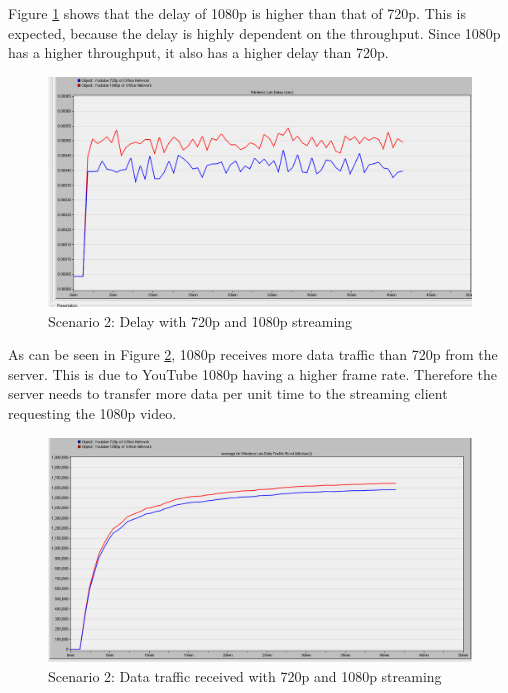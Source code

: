 Figure \ref{fig:2:delay:720p180p} shows that the delay of 1080p is higher than that of 720p. This is expected, because the delay is highly dependent on the throughput. Since 1080p has a higher throughput, it also has a higher delay than 720p.

\begin{figure}[H]
	\centering
	\includegraphics[scale=0.31]{Figures/amantianrenamed/Scenario2Delayof720pand1080p.png}
	\caption{Scenario 2: Delay with 720p and 1080p streaming}
	\label{fig:2:delay:720p180p}
\end{figure}

As can be seen in Figure \ref{fig:2:traffic:720p180p}, 1080p receives more data traffic than 720p from the server. This is due to YouTube 1080p having a higher frame rate. Therefore the server needs to transfer more data per unit time to the streaming client requesting the 1080p video.

\begin{figure}[H]
	\centering
	\includegraphics[scale=0.35]{Figures/amantianrenamed/Scenario2Averagedatatrafficreceivedof720pand1080p.png}
	\caption{Scenario 2: Data traffic received with 720p and 1080p streaming}
	\label{fig:2:traffic:720p180p}
\end{figure}

